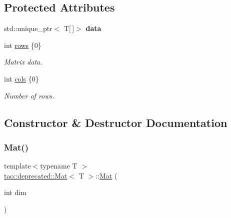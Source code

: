 \subsection*{Protected Attributes}
\begin{DoxyCompactItemize}
\item 
\mbox{\label{classtao_1_1deprecated_1_1_mat_ab50c87b259f6c6a685b3bbc46abffb34}} 
std\+::unique\+\_\+ptr$<$ T\mbox{[}$\,$\mbox{]}$>$ {\bfseries data}
\item 
\mbox{\label{classtao_1_1deprecated_1_1_mat_aefbe18686fd37ac1d5525196649282c8}} 
int \mbox{\hyperlink{classtao_1_1deprecated_1_1_mat_aefbe18686fd37ac1d5525196649282c8}{rows}} \{0\}
\begin{DoxyCompactList}\small\item\em Matrix data. \end{DoxyCompactList}\item 
\mbox{\label{classtao_1_1deprecated_1_1_mat_a987003b3e2bc3cd6b9776c6bcaed8dd2}} 
int \mbox{\hyperlink{classtao_1_1deprecated_1_1_mat_a987003b3e2bc3cd6b9776c6bcaed8dd2}{cols}} \{0\}
\begin{DoxyCompactList}\small\item\em Number of rows. \end{DoxyCompactList}\end{DoxyCompactItemize}


\subsection{Constructor \& Destructor Documentation}
\mbox{\label{classtao_1_1deprecated_1_1_mat_af505e5fdfcff8448c86fcf3d630c53a7}} 
\subsubsection{\texorpdfstring{Mat()}{Mat()}\hspace{0.1cm}{\footnotesize\ttfamily [1/5]}}
{\footnotesize\ttfamily template$<$typename T $>$ \\
\mbox{\hyperlink{classtao_1_1deprecated_1_1_mat}{tao\+::deprecated\+::\+Mat}}$<$ T $>$\+::\mbox{\hyperlink{classtao_1_1deprecated_1_1_mat}{Mat}} (\begin{DoxyParamCaption}\item[{int}]{dim }\end{DoxyParamCaption})}



